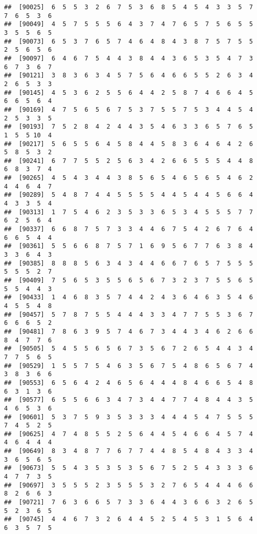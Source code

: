 \documentclass[
]{book}
\begin{document}
\begin{verbatim}
##  [90025]  6  5  5  3  2  6  7  5  3  6  8  5  4  5  4  3  3  5  7  7  6  5  3  6
##  [90049]  4  5  7  5  5  5  6  4  3  7  4  7  6  5  7  5  6  5  5  3  5  5  6  5
##  [90073]  6  5  3  7  6  5  7  4  6  4  8  4  3  8  7  5  7  5  5  2  5  6  5  6
##  [90097]  6  4  6  7  5  4  4  3  8  4  4  3  6  5  3  5  4  7  3  6  7  3  6  7
##  [90121]  3  8  3  6  3  4  5  7  5  6  4  6  6  5  5  2  6  3  4  2  6  5  3  3
##  [90145]  4  5  3  6  2  5  5  6  4  4  2  5  8  7  4  6  6  4  5  6  6  5  6  4
##  [90169]  4  7  5  6  5  6  7  5  3  7  5  5  7  5  3  4  4  5  4  2  5  3  3  5
##  [90193]  7  5  2  8  4  2  4  4  3  5  4  6  3  3  6  5  7  6  5  1  5  5 10  4
##  [90217]  5  6  5  5  6  4  5  8  4  4  5  8  3  6  4  6  4  2  6  5  8  5  3  2
##  [90241]  6  7  7  5  5  2  5  6  3  4  2  6  6  5  5  5  4  4  8  6  8  3  7  4
##  [90265]  4  5  4  3  4  4  3  8  5  6  5  4  6  5  6  5  4  6  2  4  4  6  4  7
##  [90289]  5  4  8  7  4  4  5  5  5  5  4  4  5  4  4  5  6  6  4  4  3  3  5  4
##  [90313]  1  7  5  4  6  2  3  5  3  3  6  5  3  4  5  5  5  7  7  6  2  5  6  4
##  [90337]  6  6  8  7  5  7  3  3  4  4  6  7  5  4  2  6  7  6  4  6  6  5  4  4
##  [90361]  5  5  6  6  8  7  5  7  1  6  9  5  6  7  7  6  3  8  4  3  3  6  4  3
##  [90385]  8  8  8  5  6  3  4  3  4  4  6  6  7  6  5  7  5  5  5  5  5  5  2  7
##  [90409]  7  5  6  5  3  5  5  6  5  6  7  3  2  3  7  5  5  6  5  5  5  4  4  3
##  [90433]  1  4  6  8  3  5  7  4  4  2  4  3  6  4  6  3  5  4  6  4  5  5  4  8
##  [90457]  5  7  8  7  5  5  4  4  4  3  3  4  7  7  5  5  3  6  7  6  6  6  5  2
##  [90481]  7  8  6  3  9  5  7  4  6  7  3  4  4  3  4  6  2  6  6  8  4  7  7  6
##  [90505]  5  4  5  5  6  5  6  7  3  5  6  7  2  6  5  4  4  3  4  7  7  5  6  5
##  [90529]  1  5  5  7  5  4  6  3  5  6  7  5  4  8  6  5  6  7  4  3  8  3  6  6
##  [90553]  6  5  6  4  2  4  6  5  6  4  4  4  8  4  6  6  5  4  8  6  3  1  3  6
##  [90577]  6  5  5  6  6  3  4  7  3  4  4  7  7  4  8  4  4  3  5  4  6  5  3  6
##  [90601]  5  3  7  5  9  3  5  3  3  3  4  4  4  5  4  7  5  5  5  7  4  5  2  5
##  [90625]  4  7  4  8  5  5  2  5  6  4  4  5  4  6  6  4  5  7  4  4  6  4  4  4
##  [90649]  8  3  4  8  7  7  6  7  7  4  4  8  5  4  8  4  3  3  4  3  6  5  6  5
##  [90673]  5  5  4  3  5  3  5  3  5  6  7  5  2  5  4  3  3  3  6  4  7  7  3  5
##  [90697]  3  5  5  5  2  3  5  5  5  3  2  7  6  5  4  4  4  6  6  8  2  6  6  3
##  [90721]  7  6  3  6  6  5  7  3  3  6  4  4  3  6  6  3  2  6  5  5  2  3  6  5
##  [90745]  4  4  6  7  3  2  6  4  4  5  2  5  4  5  3  1  5  6  4  6  3  5  7  5

\end{verbatim}
\end{document}
